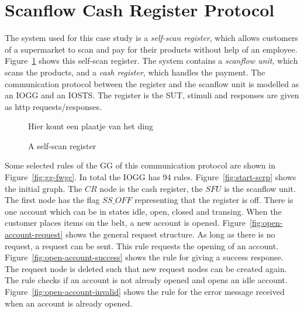 \section{Scanflow Cash Register Protocol}

The system used for this case study is a \textit{self-scan register}, which allows customers of a supermarket to scan and pay for their products without help of an employee. Figure~\ref{fig:register} shows this self-scan register. The system contains a \textit{scanflow unit}, which scans the products, and a \textit{cash register}, which handles the payment. The communication protocol between the register and the scanflow unit is modelled as an IOGG and an IOSTS. The register is the SUT, stimuli and responses are given as http requests/responses.

\begin{figure}[ht]
  \begin{center}
    Hier komt een plaatje van het ding%
  \end{center}
  \caption{A self-scan register}
  \label{fig:register}
\end{figure}

Some selected rules of the GG of this communication protocol are shown in Figure~\ref{fig:gg-fwgc}. In total the IOGG has 94 rules. Figure~\ref{fig:start-scrp} shows the initial graph. The $CR$ node is the cash register, the $SFU$ is the scanflow unit. The first node has the flag $\mathit{SS\_OFF}$ representing that the register is off. There is one account which can be in states idle, open, closed and transing. When the customer places items on the belt, a new account is opened. Figure~\ref{fig:open-account-request} shows the general request structure. As long as there is no request, a request can be sent. This rule requests the opening of an account. Figure~\ref{fig:open-account-success} shows the rule for giving a success response. The request node is deleted such that new request nodes can be created again. The rule checks if an account is not already opened and opens an idle account. Figure~\ref{fig:open-account-invalid} shows the rule for the error message received when an account is already opened. 

